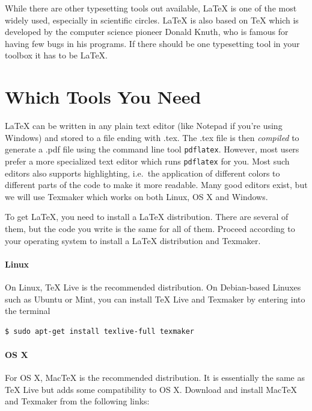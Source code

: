 While there are other typesetting tools out available, \LaTeX{} is one of the most widely used, especially in scientific circles. \LaTeX{} is also based on \TeX{} which is developed by the computer science pioneer Donald Knuth, who is famous for having few bugs in his programs. If there should be one typesetting tool in your toolbox it has to be \LaTeX{}.

\section{Which Tools You Need}
\LaTeX{} can be written in any plain text editor (like Notepad if you're using Windows) and stored to a file ending with .tex. The .tex file is then \emph{compiled} to generate a .pdf file using the command line tool \verb|pdflatex|. However, most users prefer a more specialized text editor which runs \verb|pdflatex| for you. Most such editors also supports highlighting, i.e.\ the application of different colors to different parts of the code to make it more readable. Many good editors exist, but we will use Texmaker which works on both Linux, OS X and Windows.

To get \LaTeX{}, you need to install a \LaTeX{} distribution. There are several of them, but the code you write is the same for all of them. Proceed according to your operating system to install a \LaTeX{} distribution and Texmaker.

\paragraph{Linux}
On Linux, TeX Live is the recommended distribution. On Debian-based Linuxes such as Ubuntu or Mint, you can install TeX Live and Texmaker by entering into the terminal
\begin{verbatim}
$ sudo apt-get install texlive-full texmaker
\end{verbatim}

\paragraph{OS X}
For OS X, MacTeX is the recommended distribution. It is essentially the same as TeX Live but adds some compatibility to OS X. Download and install MacTeX and Texmaker from the following links:

~\\

